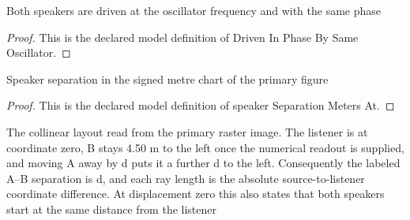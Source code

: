 \begin{definition}
  \label{def:physics:phyx-mini-0169:phyxminiproblems-problemphyxmini0169-driveninphasebysameoscillator}
  Both speakers are driven at the oscillator frequency and with the same phase
\end{definition}
\begin{proof}
  This is the declared model definition of Driven In Phase By Same Oscillator.
\end{proof}
\begin{definition}
  \label{def:physics:phyx-mini-0169:phyxminiproblems-problemphyxmini0169-speakerseparationmetersat}
  Speaker separation in the signed metre chart of the primary figure
\end{definition}
\begin{proof}
  This is the declared model definition of speaker Separation Meters At.
\end{proof}
\begin{definition}
  \label{def:physics:phyx-mini-0169:phyxminiproblems-problemphyxmini0169-hasdepictedcollineargeometry}
  The collinear layout read from the primary raster image. The listener is at coordinate zero, B stays 4.50 m to the left once the numerical readout is supplied, and moving A away by d puts it a further d to the left. Consequently the labeled A--B separation is d, and each ray length is the absolute source-to-listener coordinate difference. At displacement zero this also states that both speakers start at the same distance from the listener
\end{definition}
